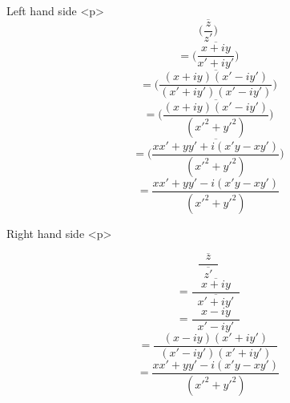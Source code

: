 Left hand side
<p>
$$\overline{\bigg(\frac{z}{z'}\bigg)}$$
$$ = \overline{\bigg(\frac{x+iy}{x'+iy'}\bigg)}$$
$$ = \overline{\bigg(\frac{(x+iy)(x'-iy')}{(x'+iy')(x'-iy')}\bigg)}$$
$$ = \overline{\bigg(\frac{(x+iy)(x'-iy')}{(x'^2+y'^2)}\bigg)}$$
$$ = \overline{\bigg(\frac{xx'+yy'+i(x'y-xy')}{(x'^2+y'^2)}\bigg)}$$
$$ = \frac{xx'+yy'-i(x'y-xy')}{(x'^2+y'^2)}$$

Right hand side
<p>



$$\frac{\overline{z}}{\enspace \overline{z'} \enspace}$$
$$ = \frac{\overline{x+iy}}{\enspace \overline{x'+iy'} \enspace}$$
$$ = \frac{x-iy}{\enspace x'-iy' \enspace}$$
$$ = \frac{(x-iy)(x'+iy')}{\enspace (x'-iy')(x'+iy') \enspace}$$
$$ = \frac{xx'+yy'-i(x'y-xy')}{\enspace (x'^2+y'^2) \enspace}$$
